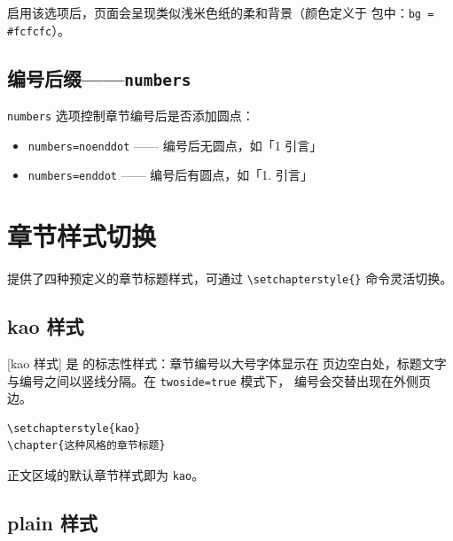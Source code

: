启用该选项后，页面会呈现类似浅米色纸的柔和背景（颜色定义于
 包中：\texttt{bg = \#fcfcfc}）。

\subsection{编号后缀——\texttt{numbers}}

\texttt{numbers} 选项控制章节编号后是否添加圆点：
\begin{itemize}
    \item \texttt{numbers=noenddot} —— 编号后无圆点，如「1 引言」
    \item \texttt{numbers=enddot} —— 编号后有圆点，如「1. 引言」
\end{itemize}


\section{章节样式切换}


 提供了四种预定义的章节标题样式，可通过
\lstinline|\setchapterstyle{}| 命令灵活切换。

\subsection{kao 样式}

{}[kao 样式] 是  的标志性样式：章节编号以大号字体显示在
页边空白处，标题文字与编号之间以竖线分隔。在 \texttt{twoside=true} 模式下，
编号会交替出现在外侧页边。

\begin{lstlisting}
\setchapterstyle{kao}
\chapter{这种风格的章节标题}
\end{lstlisting}

正文区域的默认章节样式即为 \texttt{kao}。

\subsection{plain 样式}

